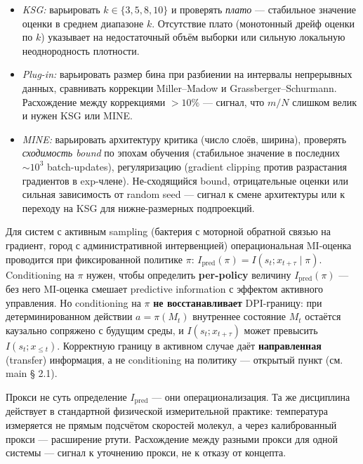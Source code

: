 \documentclass[pdflatex,sn-mathphys-ay]{sn-jnl}
\providecommand{\tightlist}{\setlength{\itemsep}{0pt}\setlength{\parskip}{0pt}}
\begin{document}
\begin{itemize}
\tightlist
\item
  \emph{KSG:} варьировать \(k \in \{3, 5, 8, 10\}\) и проверять \emph{плато} --- стабильное значение оценки в среднем диапазоне \(k\). Отсутствие плато (монотонный дрейф оценки по \(k\)) указывает на недостаточный объём выборки или сильную локальную неоднородность плотности.
\item
  \emph{Plug-in:} варьировать размер бина при разбиении на интервалы непрерывных данных, сравнивать коррекции Miller--Madow и Grassberger--Schurmann. Расхождение между коррекциями \(> 10\%\) --- сигнал, что \(m/N\) слишком велик и нужен KSG или MINE.
\item
  \emph{MINE:} варьировать архитектуру критика (число слоёв, ширина), проверять \emph{сходимость bound} по эпохам обучения (стабильное значение в последних \(\sim 10^3\) batch-updates), регуляризацию (gradient clipping против разрастания градиентов в exp-члене). Не-сходящийся bound, отрицательные оценки или сильная зависимость от random seed --- сигнал к смене архитектуры или к переходу на KSG для нижне-размерных подпроекций.
\end{itemize}

Для систем с активным sampling (бактерия с моторной обратной связью на градиент, город с административной интервенцией) операциональная MI-оценка проводится при фиксированной политике \(\pi\): \(I_{\text{pred}}(\pi) = I(s_t; x_{t+\tau} \mid \pi)\). Conditioning на \(\pi\) нужен, чтобы определить \textbf{per-policy} величину \(I_{\text{pred}}(\pi)\) --- без него MI-оценка смешает predictive information с эффектом активного управления. Но conditioning на \(\pi\) \textbf{не восстанавливает} DPI-границу: при детерминированном действии \(a = \pi(M_t)\) внутреннее состояние \(M_t\) остаётся каузально сопряжено с будущим среды, и \(I(s_t; x_{t+\tau})\) может превысить \(I(s_t; x_{\le t})\). Корректную границу в активном случае даёт \textbf{направленная} (transfer) информация, а не conditioning на политику --- открытый пункт (см. main § 2.1).

Прокси не суть определение \(I_{\text{pred}}\) --- они операционализация. Та же дисциплина действует в стандартной физической измерительной практике: температура измеряется не прямым подсчётом скоростей молекул, а через калиброванный прокси --- расширение ртути. Расхождение между разными прокси для одной системы --- сигнал к уточнению прокси, не к отказу от концепта.
\end{document}

